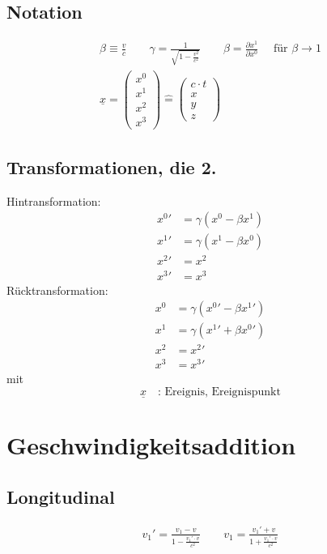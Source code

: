 \subsection{Notation}
\begin{gather}
	\beta\equiv\frac{v}{c} \qquad \gamma=\frac{1}{\sqrt{1-\frac{v^2}{c^2}}} \qquad \beta=\frac{\partial x^1}{\partial x^0} \quad\text{ f\"ur }\beta\rightarrow 1 \\
	\underline{x}=\begin{pmatrix} x^0 \\ x^1 \\ x^2 \\ x^3 \end{pmatrix} \hat{=}\begin{pmatrix} c\cdot t \\ x \\ y \\ z \end{pmatrix}
\end{gather}

\subsection{Transformationen, die 2.}
\noindent Hintransformation:
\begin{align*}
	{x^0}' &= \gamma(x^0-\beta x^1) \\
	{x^1}' &= \gamma(x^1-\beta x^0) \\
	{x^2}' &= x^2 \\
	{x^3}' &= x^3
\end{align*}
\noindent R\"ucktransformation:
\begin{align*}
	x^0 &= \gamma({x^0}'-\beta {x^1}') \\
	x^1 &= \gamma({x^1}'+\beta {x^0}') \\
	x^2 &= {x^2}' \\
	x^3 &= {x^3}'
\end{align*}
\noindent mit
\begin{equation*}
	\underline{x}\quad\text{: Ereignis, Ereignispunkt}
\end{equation*}

\section{Geschwindigkeitsaddition}
\subsection{Longitudinal}
\begin{gather}
	v_1' = \frac{v_1-v}{1-\frac{v_1'\cdot v}{c^2}}
	\qquad
	v_1 = \frac{v_1'+v}{1+\frac{v_1'\cdot v}{c^2}}
\end{gather}

